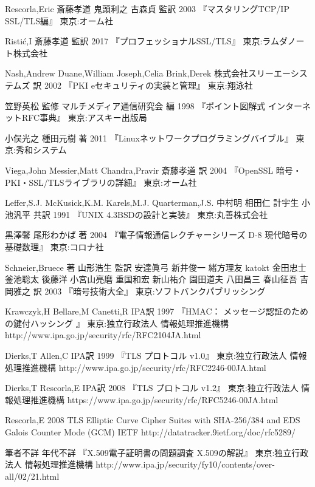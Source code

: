 \begin{thebibliography}{99}
\item
	Rescorla,Eric
	斎藤孝道 鬼頭利之 古森貞 監訳
	2003
	『マスタリングTCP/IP　SSL/TLS編』
	東京:オーム社
\item
	Risti\'c,I
	斎藤孝道 監訳
	2017
	『プロフェッショナルSSL/TLS』
	東京:ラムダノート株式会社
\item
	Nash,Andrew Duane,William Joseph,Celia Brink,Derek
	株式会社スリーエーシステムズ 訳
	2002
	『PKI eセキュリティの実装と管理』
	東京:翔泳社
\item
	笠野英松 監修
	マルチメディア通信研究会 編
	1998
	『ポイント図解式 インターネットRFC事典』
	東京:アスキー出版局
\item
	小俣光之 種田元樹 著
	2011
	『Linuxネットワークプログラミングバイブル』
	東京:秀和システム
\item
	Viega,John Messier,Matt Chandra,Pravir
	斎藤孝道 訳
	2004
	『OpenSSL 暗号・PKI・SSL/TLSライブラリの詳細』
	東京:オーム社
\item
	Leffer,S.J. McKusick,K.M. Karels,M.J. Quarterman,J.S.
	中村明 相田仁 計宇生 小池汎平 共訳
	1991
	『UNIX 4.3BSDの設計と実装』
	東京:丸善株式会社 
\item
	黒澤馨 尾形わかば 著
	2004
	『電子情報通信レクチャーシリーズ D-8 現代暗号の基礎数理』
	東京:コロナ社
\item
	Schneier,Bruece 著
	山形浩生 監訳
	安達眞弓 新井俊一 緒方理友 katokt 金田忠士 釜池聡太 後藤洋 小宮山亮磨 重国和宏 新山祐介 園田道夫 八田昌三 春山征吾 吉岡雅之 訳
	2003
	『暗号技術大全』
	東京:ソフトバンクパブリッシング
\item
	Krawczyk,H Bellare,M Canetti,R
	IPA訳
	1997
	『HMAC： メッセージ認証のための鍵付ハッシング 』
	東京:独立行政法人 情報処理推進機構
	http://www.ipa.go.jp/security/rfc/RFC2104JA.html
\item
	Dierks,T Allen,C
	IPA訳
	1999
	『TLS プロトコル v1.0』
	東京:独立行政法人 情報処理推進機構
	http://www.ipa.go.jp/security/rfc/RFC2246-00JA.html
\item
	Dierks,T Rescorla,E
	IPA訳
	2008
	『TLS プロトコル v1.2』
	東京:独立行政法人 情報処理推進機構
	https://www.ipa.go.jp/security/rfc/RFC5246-00JA.html
\item
	Rescorla,E
	2008
	TLS Elliptic Curve Cipher Suites with SHA-256/384 and EDS Galois Counter Mode (GCM)
	IETF
	http://datatracker.9ietf.org/doc/rfc5289/
\item
	筆者不詳
	年代不詳
	『X.509電子証明書の問題調査 X.509の解説』
	東京:独立行政法人 情報処理推進機構
	http://www.ipa.jp/security/fy10/contents/over-all/02/21.html

\end{thebibliography}
